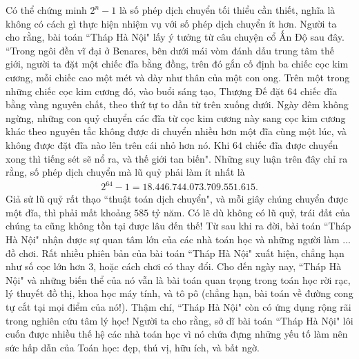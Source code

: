 	\vskip 0.1cm
	Có thể chứng minh $2^n - 1$  là số phép dịch chuyển tối thiểu cần thiết, nghĩa là không có cách gì thực hiện nhiệm vụ với số phép dịch chuyển ít hơn.
	\vskip 0.1cm
	Người ta cho rằng, bài toán ``Tháp Hà Nội" lấy ý tưởng từ câu chuyện cổ Ấn Độ sau đây.
	\vskip 0.1cm
	``Trong ngôi đền vĩ đại ở Benares, bên dưới mái vòm đánh dấu trung tâm thế giới, người ta đặt một chiếc đĩa bằng đồng, trên đó gắn cố định ba chiếc cọc kim cương, mỗi chiếc cao một mét và dày như thân của một con ong. Trên một trong những chiếc cọc  kim cương đó, vào buổi sáng tạo, Thượng Đế đặt $64$ chiếc đĩa bằng vàng nguyên chất, theo thứ tự to dần từ trên xuống dưới.  Ngày đêm không ngừng, những con quỷ chuyển các đĩa từ cọc kim cương này sang cọc kim cương khác theo nguyên tắc không được di chuyển nhiều hơn một đĩa cùng một lúc, và không được đặt đĩa nào lên trên cái nhỏ hơn nó. Khi $64$ chiếc  đĩa  được chuyển xong thì tiếng sét sẽ nổ ra, và thế giới tan biến".
	\vskip 0.1cm
	Những suy luận trên đây chỉ ra rằng, số phép dịch chuyển mà lũ quỷ phải làm ít nhất là
	\begin{align*}
		2^{64} - 1= 18{.}446{.}744{.}073{.}709{.}551{.}615.
	\end{align*}
	Giả sử lũ quỷ rất thạo ``thuật toán dịch chuyển", và mỗi giây chúng chuyển được một đĩa, thì phải mất khoảng $585$ tỷ năm. Có lẽ dù không có lũ quỷ, trái đất của chúng ta cũng không tồn tại được lâu đến thế!
	\vskip 0.1cm
	Từ sau khi ra đời, bài toán ``Tháp Hà Nội" nhận được sự quan tâm lớn của các nhà toán học và những người làm \!... đồ chơi. Rất nhiều phiên bản của bài toán ``Tháp Hà Nội" xuất hiện, chẳng hạn như số cọc lớn hơn $3$, hoặc cách chơi có thay đổi. Cho đến ngày nay, ``Tháp Hà Nội" và những biến thể của nó vẫn là bài toán quan trọng trong toán học rời rạc, lý thuyết đồ thị, khoa học máy tính, và tô pô (chẳng hạn, bài toán về đường cong tự cắt tại mọi điểm của nó!). Thậm chí, ``Tháp Hà Nội" còn có ứng dụng rộng rãi trong nghiên cứu tâm lý học!
	\vskip 0.1cm
	Người ta cho rằng, sở dĩ bài toán ``Tháp Hà Nội" lôi cuốn được nhiều thế hệ các nhà toán học vì nó chứa đựng những yếu tố làm nên sức hấp dẫn của Toán học: đẹp, thú vị, hữu ích, và bất ngờ.
	\newpage
	\begingroup

